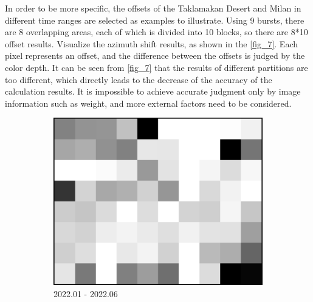 \documentclass[a4paper,fleqn]{cas-sc}
\begin{document}
In order to be more specific, the offsets of the Taklamakan Desert and Milan in different time ranges are selected as examples to illustrate. Using 9 bursts, there are 8 overlapping areas, each of which is divided into 10 blocks, so there are 8*10 offset results. Visualize the azimuth shift results, as shown in the \ref{fig_7}. Each pixel represents an offset, and the difference between the offsets is judged by the color depth. It can be seen from \ref{fig_7} that the results of different partitions are too different, which directly leads to the decrease of the accuracy of the calculation results. It is impossible to achieve accurate judgment only by image information such as weight, and more external factors need to be considered. \par

\begin{figure}
    \centering
    \begin{subfigure}{0.3\textwidth}
        \centering
        \includegraphics[width=\textwidth]{figure/The azimuth shift/shift_Milan_asc_20220626.png}
        \caption{2022.01 - 2022.06}
        \label{fig_7a}
    \end{subfigure}
    \begin{subfigure}{0.3\textwidth}
        \centering

\end{subfigure}
\end{figure}
\end{document}
